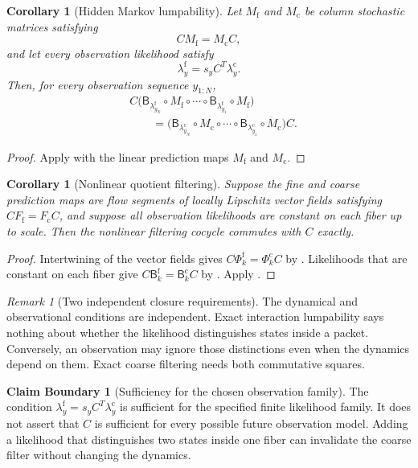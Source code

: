 \documentclass[11pt]{article}
\newtheorem{corollary}[theorem]{Corollary}
\theoremstyle{definition}
\newtheorem{boundary}[theorem]{Claim Boundary}
\theoremstyle{remark}
\newtheorem{remark}[theorem]{Remark}
\newcommand{\fine}{\mathrm f}
\newcommand{\coarse}{\mathrm c}
\newcommand{\Bup}{\mathsf B}
\begin{document}
\begin{corollary}[Hidden Markov lumpability]\label{cor:hmm-lumpability}
Let $M_{\fine}$ and $M_{\coarse}$ be column stochastic matrices satisfying
\[
  CM_{\fine}=M_{\coarse}C,
\]
and let every observation likelihood satisfy
\[
  \lambda_y^{\fine}=s_yC^T\lambda_y^{\coarse}.
\]
Then, for every observation sequence $y_{1:N}$,
\begin{align*}
&C\bigl(
\Bup_{\lambda_{y_N}^{\fine}}\circ M_{\fine}
\circ\cdots\circ
\Bup_{\lambda_{y_1}^{\fine}}\circ M_{\fine}
\bigr)\\
&\qquad=
\bigl(
\Bup_{\lambda_{y_N}^{\coarse}}\circ M_{\coarse}
\circ\cdots\circ
\Bup_{\lambda_{y_1}^{\coarse}}\circ M_{\coarse}
\bigr)C.
\end{align*}
\end{corollary}

\begin{proof}
Apply  with the linear prediction maps $M_{\fine}$ and $M_{\coarse}$.
\end{proof}

\begin{corollary}[Nonlinear quotient filtering]\label{cor:nonlinear-filtering}
Suppose the fine and coarse prediction maps are flow segments of locally Lipschitz vector fields satisfying $CF_{\fine}=F_{\coarse}C$, and suppose all observation likelihoods are constant on each fiber up to scale.  Then the nonlinear filtering cocycle commutes with $C$ exactly.
\end{corollary}

\begin{proof}
Intertwining of the vector fields gives $C\Phi_k^{\fine}=\Phi_k^{\coarse}C$ by .  Likelihoods that are constant on each fiber give $C\Bup_k^{\fine}=\Bup_k^{\coarse}C$ by .  Apply .
\end{proof}

\begin{remark}[Two independent closure requirements]\label{rem:two-closure-requirements}
The dynamical and observational conditions are independent.  Exact interaction lumpability says nothing about whether the likelihood distinguishes states inside a packet.  Conversely, an observation may ignore those distinctions even when the dynamics depend on them.  Exact coarse filtering needs both commutative squares.
\end{remark}

\begin{boundary}[Sufficiency for the chosen observation family]
The condition $\lambda_y^{\fine}=s_yC^T\lambda_y^{\coarse}$ is sufficient for the specified finite likelihood family.  It does not assert that $C$ is sufficient for every possible future observation model.  Adding a likelihood that distinguishes two states inside one fiber can invalidate the coarse filter without changing the dynamics.
\end{boundary}
\end{document}
